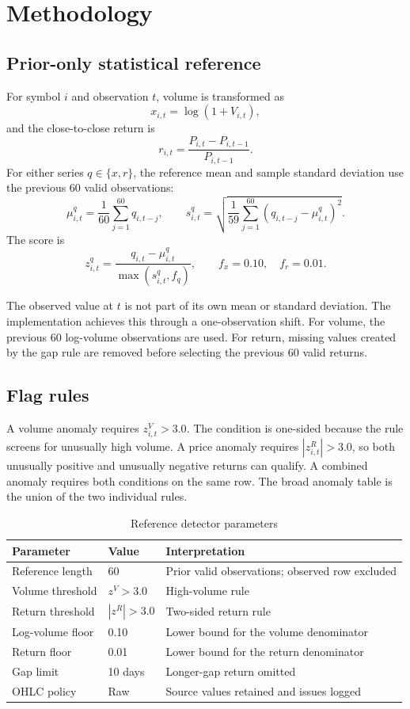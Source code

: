 \chapter{Methodology}

\section{Prior-only statistical reference}

For symbol $i$ and observation $t$, volume is transformed as
\[
  x_{i,t}=\log(1+V_{i,t}),
\]
and the close-to-close return is
\[
  r_{i,t}=\frac{P_{i,t}-P_{i,t-1}}{P_{i,t-1}}.
\]
For either series $q\in\{x,r\}$, the reference mean and sample standard
deviation use the previous 60 valid observations:
\[
 \mu^q_{i,t}=\frac{1}{60}\sum_{j=1}^{60}q_{i,t-j},
 \qquad
 s^q_{i,t}=\sqrt{\frac{1}{59}\sum_{j=1}^{60}
 \left(q_{i,t-j}-\mu^q_{i,t}\right)^2}.
\]
The score is
\[
 z^q_{i,t}=\frac{q_{i,t}-\mu^q_{i,t}}
 {\max\left(s^q_{i,t},f_q\right)},
 \qquad f_x=0.10,\quad f_r=0.01.
\]

The observed value at $t$ is not part of its own mean or standard deviation.
The implementation achieves this through a one-observation shift. For volume,
the previous 60 log-volume observations are used. For return, missing values
created by the gap rule are removed before selecting the previous 60 valid
returns.

\section{Flag rules}

A volume anomaly requires $z^V_{i,t}>3.0$. The condition is one-sided because
the rule screens for unusually high volume. A price anomaly requires
$|z^R_{i,t}|>3.0$, so both unusually positive and unusually negative returns
can qualify. A combined anomaly requires both conditions on the same row. The
broad anomaly table is the union of the two individual rules.

\begin{table}[htbp]
\centering
\caption{Reference detector parameters}
\begin{tabularx}{0.94\textwidth}{@{}l l X@{}}
\toprule
Parameter & Value & Interpretation \\
\midrule
Reference length & 60 & Prior valid observations; observed row excluded \\
Volume threshold & $z^V>3.0$ & High-volume rule \\
Return threshold & $|z^R|>3.0$ & Two-sided return rule \\
Log-volume floor & 0.10 & Lower bound for the volume denominator \\
Return floor & 0.01 & Lower bound for the return denominator \\
Gap limit & 10 days & Longer-gap return omitted \\
OHLC policy & Raw & Source values retained and issues logged \\
\bottomrule
\end{tabularx}
\end{table}


